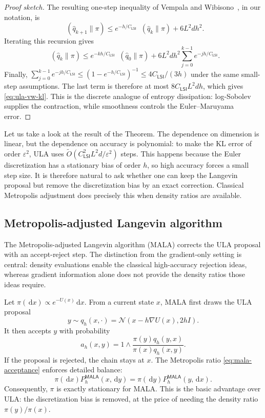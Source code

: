 \documentclass{amsart}
\numberwithin{equation}{section}
\theoremstyle{plain}
\theoremstyle{definition}
\theoremstyle{remark}
\DeclareMathOperator{\KL}{D_{\mathsf{KL}}}
\newcommand{\dd}{\,\mathrm{d}}
\newcommand{\Id}{I}
\newcommand{\wh}[1]{\widehat{#1}}
\newcommand{\deltaerr}{\varepsilon}
\newcommand{\normal}[2]{\mathcal{N}\!\left(#1,#2\right)}
\newcommand{\tO}{\widetilde O}
\begin{document}
\begin{proof}[Proof sketch]
The resulting one-step inequality of Vempala and
Wibisono~\cite{vempala2019rapidula}, in our notation, is
\[
    \KL(\wh q_{k+1}\|\pi)
    \leq
    e^{-h/C_{\mathsf{LSI}}}\KL(\wh q_k\|\pi)
    +6L^2dh^2.
\]
Iterating this recursion gives
\[
    \KL(\wh q_k\|\pi)
    \leq
    e^{-kh/C_{\mathsf{LSI}}}\KL(\wh q_0\|\pi)
    +
    6L^2dh^2
    \sum_{j=0}^{k-1} e^{-jh/C_{\mathsf{LSI}}}.
\]
Finally,
$\sum_{j=0}^{k-1}e^{-jh/C_{\mathsf{LSI}}}
\leq (1-e^{-h/C_{\mathsf{LSI}}})^{-1}
 \leq 4C_{\mathsf{LSI}}/(3h)$ under the same small-step assumptions.  The
last term is therefore at most $8C_{\mathsf{LSI}}L^2dh$, which gives
\eqref{eq:ula-vw-kl}.  This is the
discrete analogue of entropy dissipation: log-Sobolev supplies the contraction,
while smoothness controls the Euler--Maruyama error.
\end{proof}

Let us take a look at the result of the Theorem. The dependence on
dimension is linear, but the dependence on accuracy is polynomial:
to make the KL error of order $\deltaerr^2$, ULA uses
$\tO(C_{\mathsf{LSI}}^2L^2d/\deltaerr^2)$ steps.  This happens because the
Euler discretization has a stationary bias of order $h$, so high accuracy
forces a small step size.  It is therefore natural to ask whether one can keep
the Langevin proposal but remove the discretization bias by an exact correction.
Classical Metropolis adjustment does precisely this when density ratios are
available.

\subsection{Metropolis-adjusted Langevin algorithm}

The Metropolis-adjusted Langevin algorithm (MALA) corrects the ULA proposal with
an accept-reject step.  The distinction from the gradient-only setting is central:
density evaluations enable the classical high-accuracy rejection ideas, whereas
gradient information alone does not provide the density ratios those ideas
require.

Let $\pi(\dd x)\propto e^{-U(x)}\dd x$.  From a current state $x$, MALA first
draws the ULA proposal
\[
    y\sim q_h(x,\cdot)
    =
    \normal{x-h\nabla U(x)}{2h\Id}.
\]
It then accepts $y$ with probability
\begin{equation}\label{eq:mala-acceptance}
    a_h(x,y)
    =
    1\wedge
    \frac{\pi(y)q_h(y,x)}{\pi(x)q_h(x,y)}.
\end{equation}
If the proposal is rejected, the chain stays at $x$.  The Metropolis ratio
\eqref{eq:mala-acceptance} enforces detailed balance:
\[
    \pi(\dd x)P_h^{\mathsf{MALA}}(x,\dd y)
    =
    \pi(\dd y)P_h^{\mathsf{MALA}}(y,\dd x).
\]
Consequently, $\pi$ is exactly stationary for MALA\@.  This is the basic
advantage over ULA: the discretization bias is removed, at the price of needing
the density ratio $\pi(y)/\pi(x)$.
\end{document}
